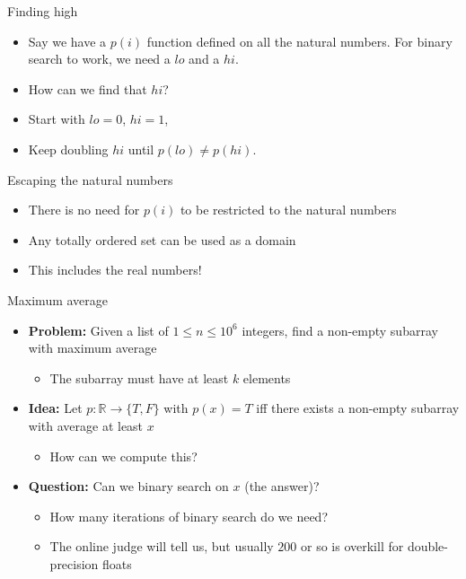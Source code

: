 \documentclass[t]{beamer}
\newcommand{\R}{\mathbb{R}}
\newcommand{\ra}{\rightarrow}
\begin{document}
\begin{frame}{Finding high}
\begin{itemize}
    \item Say we have a $p(i)$ function defined on all the natural numbers. For binary search to work, we need a $lo$ and a $hi$. 
    
    \item How can we find that $hi$?
    
    \pause
    
    \item Start with $lo = 0$, $hi = 1$, 
    \item Keep doubling $hi$ until $p(lo) \neq p(hi)$.
\end{itemize}
\end{frame}

\begin{frame}{Escaping the natural numbers}
\begin{itemize}
    \item There is no need for $p(i)$ to be restricted to the natural numbers
    
    \pause 
    
    \item Any totally ordered set can be used as a domain
    
    \pause 
    
    \item This includes the real numbers!
\end{itemize}
\end{frame}

\begin{frame}{Maximum average}
\begin{itemize}
    \item \textbf{Problem:} Given a list of $1 \leq n \leq 10^6$ integers, find a non-empty subarray with maximum average
    \pause
    \begin{itemize}
        \item The subarray must have at least $k$ elements
    \end{itemize}
    \pause
    \item \textbf{Idea:} Let $p : \R \ra \{T, F\}$ with $p(x) = T$ iff there exists a non-empty subarray with average at least $x$
    \pause
    \begin{itemize}
        \item How can we compute this?
    \end{itemize}
    \pause
    \item \textbf{Question:} Can we binary search on $x$ (the answer)?
    \pause
    \begin{itemize}
        \item How many iterations of binary search do we need?
        \pause
        \item The online judge will tell us, but usually $200$ or so is overkill for double-precision floats
    \end{itemize}
\end{itemize}
\end{frame}
\end{document}
